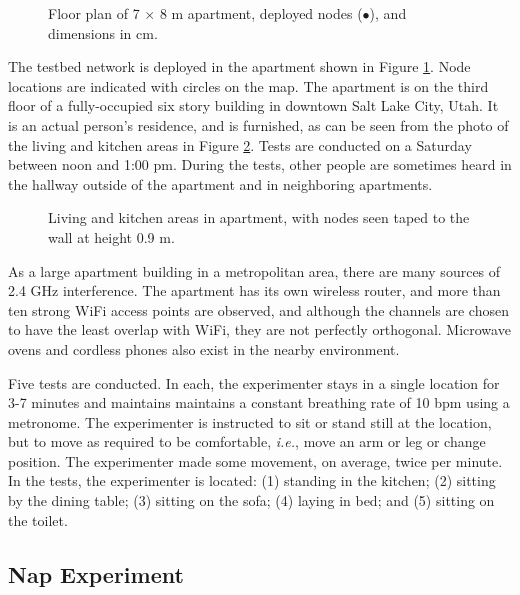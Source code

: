 \documentclass[10pt,journal,letterpaper]{IEEEtran}
\newcommand{\ie}{{\it i.e.}}
\begin{document}
\begin{figure}[tbhp]
\centerline{  }
\caption{Floor plan of 7 $\times$ 8 m apartment, deployed nodes ($\bullet$), and dimensions in cm.}
    \label{F:ApartmentMap}
\end{figure}

The testbed network is deployed in the apartment shown in Figure \ref{F:ApartmentMap}.  Node locations are indicated with circles on the map.  The apartment is on the third floor of a fully-occupied six story building in downtown Salt Lake City, Utah.  It is an actual person's residence, and is furnished, as can be seen from the photo of the living and kitchen areas in Figure \ref{F:ApartmentPhoto}.  Tests are conducted on a Saturday between noon and 1:00 pm.  During the tests, other people are sometimes heard in the hallway outside of the apartment and in neighboring apartments.

\begin{figure}[hbtp]
\centerline{  }
\caption{Living and kitchen areas in apartment, with nodes seen taped to the wall at height 0.9 m.}
    \label{F:ApartmentPhoto}
\end{figure}

As a large apartment building in a metropolitan area, there are many sources of 2.4 GHz interference. The apartment has its own wireless router, and more than ten strong WiFi access points are observed, and although the channels are chosen to have the least overlap with WiFi, they are not perfectly orthogonal.  Microwave ovens and cordless phones also exist in the nearby environment. 

 Five tests are conducted.  In each, the experimenter stays in a single location for 3-7 minutes and maintains maintains a constant breathing rate of 10 bpm using a metronome.  The experimenter is instructed to sit or stand still at the location, but to move as required to be comfortable, \ie, move an arm or leg or change position.  The experimenter made some movement, on average, twice per minute.  In the tests, the experimenter is located: (1) standing in the kitchen; (2) sitting by the dining table; (3) sitting on the sofa; (4) laying in bed; and (5) sitting on the toilet.


\subsection{Nap Experiment} \label{S:Experiment2}
\end{document}
